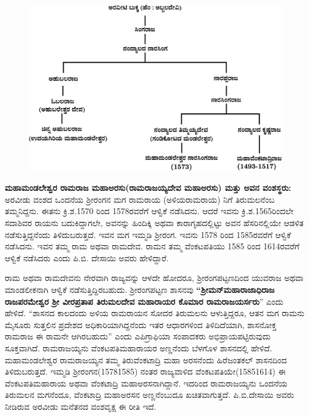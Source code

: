 \begin{figure}[H]
\includegraphics[scale=1.2]{images/chap3/chap3fig41.jpeg}
\end{figure}

\newpage

\textbf{ಮಹಾಮಂಡಲೇಶ್ವರ ರಾಮರಾಜ ಮಹಾಅರಸು(ರಾಮರಾಜಯ್ಯದೇವ ಮಹಾಅರಸು) ಮತ್ತು ಅವನ ವಂಶಸ್ಥರು:} ಅರವೀಡು ವಂಶದ ಒಂದನೆಯ ಶ‍್ರೀರಂಗನ ಮಗ ರಾಮರಾಯ (ಅಳಿಯರಾಮರಾಯ) ನಿಗೆ ತಿರುಮಲನೆಂಬ ತಮ್ಮನಿದ್ದನು. ಈತನು ಕ್ರಿ.ಶ.1570 ರಿಂದ 1578ರವರೆಗೆ ಆಳ್ವಿಕೆ ನಡೆಸಿದನು. ಆದರೆ ಇವನು ಕ್ರಿ.ಶ.1565ರಿಂದಲೇ ಸದಾಶಿವರ ರಾಯನು ಬದುಕಿದ್ದಾಗಲೇ, ಅವನನ್ನು ಹಿಂದಿಕ್ಕಿ ಅಥವಾ ಕಾರಾಗೃಹದಲ್ಲಿಟ್ಟು ಅವನ ಹೆಸರಿನಲ್ಲಿಯೇ ಆಡಳಿತ ನಡೆಸುತ್ತಿದ್ದನೆಂದು ತಿಳಿದುಬರುತ್ತದೆ. ಇವನ ಮಗ ಇಮ್ಮಡಿ ಶ‍್ರೀರಂಗ. ಇವನು 1578 ರಿಂದ 1585ರವರೆಗೆ ಆಳ್ವಿಕೆ ನಡೆಸಿದನು. ಇವನ ತಮ್ಮ ರಾಮ ಅಥವಾ ರಾಮದೇವ. ರಾಮನ ತಮ್ಮ ವೆಂಕಟಪತಿಯು 1585 ರಿಂದ 1614ರವರೆಗೆ ಆಳ್ವಿಕೆ ನಡೆಸಿದರು ಎಂದು ಪಿ.ಬಿ. ದೇಸಾಯಿ ಅವರು ಹೇಳಿದ್ದಾರೆ.

ರಾಮ ಅಥವಾ ರಾಮದೇವನು ನೇರವಾಗಿ ರಾಜ್ಯವನ್ನು ಆಳದೇ ಹೋದರೂ, ಶ‍್ರೀರಂಗಪಟ್ಟಣದಿಂದ ಯುವರಾಜ ಅಥವಾ ಮಾಂಡಲೀಕನಾಗಿ ಆಳ್ವಿಕೆ ನಡೆಸುತ್ತಿದ್ದಿರಬಹುದು. ಶ‍್ರೀರಂಗಪಟ್ಟಣ ಶಾಸನವು \textbf{“ಶ‍್ರೀಮನ್​ ಮಹಾರಾಜಾಧಿರಾಜ ರಾಜಪರಮೇಶ್ವರ ಶ‍್ರೀ ವೀರಪ್ರತಾಪ ತಿರುಮಲದೇವ ಮಹಾರಾಯರ ಕೊಮಾರ ರಾಮರಾಜಯರ್ಸರು}” ಎಂದು ಹೇಳಿದೆ. “ಶಾಸನದ ಕಾಲದಂದು ಅಳಿಯ ರಾಮರಾಯನ ಸೋದರ ತಿರುಮಲನು ಆಳುತ್ತಿದ್ದರೂ, ಆತನ ಮಗ ರಾಮನು ಮೈಸೂರು ಸುತ್ತಲಿನ ಪ್ರದೇಶದ ಅಧಿಕಾರಿಯಾಗಿದ್ದನೆಂದು ಇತರ ಆಧಾರಗಳಿಂದ ತಿಳಿದಿದೆಯಾಗಿ, ಶಾಸನೋಕ್ತ ರಾಮರಾಜ ಈ ರಾಮನೇ ಆಗಿರಬಹುದು” ಎಂದು ಎಪಿಗ್ರಾಫಿಯಾ ಸಂಪಾದಕರು ಅಭಿಪ್ರಾಯಪಟ್ಟಿರುವುದು ಸೂಕ್ತವಾಗಿದೆ. ರಾಮರಾಜಯ್ಯನು ವೆಂಕಟಪತಿಮಹಾರಾಯರ ಅಣ್ಣನೆಂದು ಬೆಳಗೊಳ ಶಾಸನದಲ್ಲಿ ಹೇಳಿದೆ. ಮಹಾಮಂಡಲೇಶ್ವರ ರಾಮರಾಜಯ್ಯನ ತಮ್ಮ ತಿರುವೆಂಕಟಾದ್ರಿ ಮಹಾ ಅರಸನೆಂದು ಹಿರೆಜಂತಕಲ್​ ಶಾಸನದಿಂದ ತಿಳಿದುಬರುತ್ತದೆ. ಇಮ್ಮಡಿ ಶ‍್ರೀರಂಗನ(1578\enginline{-}1585) ನಂತರ ರಾಜ್ಯವಾಳಿದ ವೆಂಕಟಪತಿಯೇ(1585\enginline{-}1614) ಈ ವೆಂಕಟಪತಿಮಹಾರಾಯ ಅಥವಾ ವೆಂಕಟಾದ್ರಿ ಮಹಾಅರಸ\-ನಾಗಿದ್ದಾನೆ. ಇದರಿಂದ ರಾಮರಾಜಯ್ಯನು ಒಂದನೆಯ ತಿರುಮಲನ ಮಗನೆಂದೂ, ವೆಂಕಟಾದ್ರಿ ಮಹಾಅರಸನ ಅಣ್ಣ\-ನೆಂಬುದೂ ಖಚಿತವಾಗುತ್ತದೆ. ಪಿ.ಬಿ.ದೇಸಾಯಿ ಅವರು ನೀಡಿರುವ ಅರವೀಡು ಮನೆತನದ ವಂಶವೃಕ್ಷ ಈ ರೀತಿ ಇದೆ.

